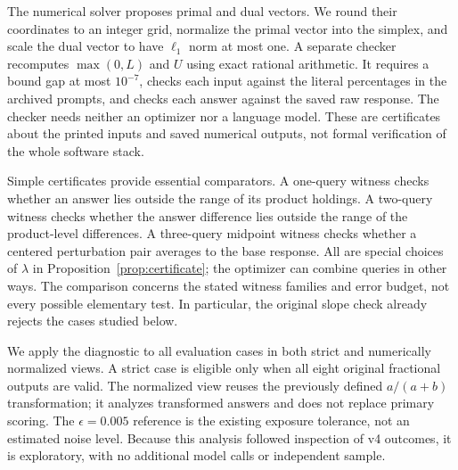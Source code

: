 The numerical solver proposes primal and dual vectors. We round their coordinates to an integer grid, normalize the primal vector into the simplex, and scale the dual vector to have $\ell_1$ norm at most one. A separate checker recomputes $\max(0,L)$ and $U$ using exact rational arithmetic. It requires a bound gap at most $10^{-7}$, checks each input against the literal percentages in the archived prompts, and checks each answer against the saved raw response. The checker needs neither an optimizer nor a language model. These are certificates about the printed inputs and saved numerical outputs, not formal verification of the whole software stack.

Simple certificates provide essential comparators. A one-query witness checks whether an answer lies outside the range of its product holdings. A two-query witness checks whether the answer difference lies outside the range of the product-level differences. A three-query midpoint witness checks whether a centered perturbation pair averages to the base response. All are special choices of $\lambda$ in Proposition~\ref{prop:certificate}; the optimizer can combine queries in other ways. The comparison concerns the stated witness families and error budget, not every possible elementary test. In particular, the original slope check already rejects the cases studied below.

We apply the diagnostic to all evaluation cases in both strict and numerically normalized views. A strict case is eligible only when all eight original fractional outputs are valid. The normalized view reuses the previously defined $a/(a+b)$ transformation; it analyzes transformed answers and does not replace primary scoring. The $\epsilon=0.005$ reference is the existing exposure tolerance, not an estimated noise level. Because this analysis followed inspection of v4 outcomes, it is exploratory, with no additional model calls or independent sample.

